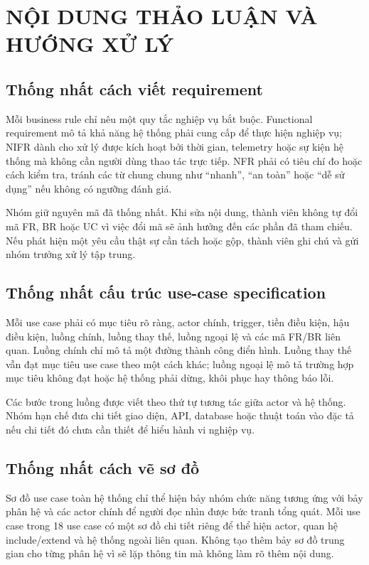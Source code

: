\documentclass[10pt,a4paper]{article}
\begin{document}
\section{NỘI DUNG THẢO LUẬN VÀ HƯỚNG XỬ LÝ}

\subsection{Thống nhất cách viết requirement}

Mỗi business rule chỉ nêu một quy tắc nghiệp vụ bắt buộc. Functional requirement mô tả khả năng hệ thống phải cung cấp để thực hiện nghiệp vụ; NIFR dành cho xử lý được kích hoạt bởi thời gian, telemetry hoặc sự kiện hệ thống mà không cần người dùng thao tác trực tiếp. NFR phải có tiêu chí đo hoặc cách kiểm tra, tránh các từ chung chung như ``nhanh'', ``an toàn'' hoặc ``dễ sử dụng'' nếu không có ngưỡng đánh giá.

Nhóm giữ nguyên mã đã thống nhất. Khi sửa nội dung, thành viên không tự đổi mã FR, BR hoặc UC vì việc đổi mã sẽ ảnh hưởng đến các phần đã tham chiếu. Nếu phát hiện một yêu cầu thật sự cần tách hoặc gộp, thành viên ghi chú và gửi nhóm trưởng xử lý tập trung.

\subsection{Thống nhất cấu trúc use-case specification}

Mỗi use case phải có mục tiêu rõ ràng, actor chính, trigger, tiền điều kiện, hậu điều kiện, luồng chính, luồng thay thế, luồng ngoại lệ và các mã FR/BR liên quan. Luồng chính chỉ mô tả một đường thành công điển hình. Luồng thay thế vẫn đạt mục tiêu use case theo một cách khác; luồng ngoại lệ mô tả trường hợp mục tiêu không đạt hoặc hệ thống phải dừng, khôi phục hay thông báo lỗi.

Các bước trong luồng được viết theo thứ tự tương tác giữa actor và hệ thống. Nhóm hạn chế đưa chi tiết giao diện, API, database hoặc thuật toán vào đặc tả nếu chi tiết đó chưa cần thiết để hiểu hành vi nghiệp vụ.

\subsection{Thống nhất cách vẽ sơ đồ}

Sơ đồ use case toàn hệ thống chỉ thể hiện bảy nhóm chức năng tương ứng với bảy phân hệ và các actor chính để người đọc nhìn được bức tranh tổng quát. Mỗi use case trong 18 use case có một sơ đồ chi tiết riêng để thể hiện actor, quan hệ include/extend và hệ thống ngoài liên quan. Không tạo thêm bảy sơ đồ trung gian cho từng phân hệ vì sẽ lặp thông tin mà không làm rõ thêm nội dung.
\end{document}
